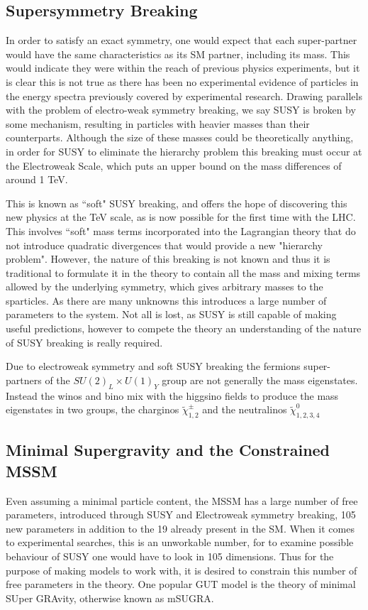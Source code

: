 \subsection{Supersymmetry Breaking}

In order to satisfy an exact symmetry, one would expect that each super-partner would have the same characteristics as its SM partner, including its mass. This would indicate they were within the reach of previous physics experiments, but it is clear this is not true as there has been no experimental evidence of particles in the energy spectra previously covered by experimental research. Drawing parallels with the problem of electro-weak symmetry breaking, we say SUSY is broken by some mechanism, resulting in particles with heavier masses than their counterparts. Although the size of these masses could be theoretically anything, in order for SUSY to eliminate the hierarchy problem this breaking must occur at the Electroweak Scale, which puts an upper bound on the mass differences of around 1 TeV.  

This is known as ``soft" SUSY breaking, and offers the hope of discovering this new physics at the TeV scale, as is now possible for the first time with the LHC. This involves ``soft" mass terms incorporated into the Lagrangian theory that do not introduce quadratic divergences that would provide a new "hierarchy problem". However, the nature of this breaking is not known and thus it is traditional to formulate it in the theory to contain all the mass and mixing terms allowed by the underlying symmetry, which gives arbitrary masses to the sparticles. As there are many unknowns this introduces a large number of parameters to the system. Not all is lost, as SUSY is still capable of making useful predictions, however to compete the theory an understanding of the nature of SUSY breaking is really required. 

Due to electroweak symmetry and soft SUSY breaking the fermions super-partners of the $SU(2)_{L} \times U(1)_{Y}$ group are not generally the mass eigenstates. Instead the winos and bino mix with the higgsino fields to produce the mass eigenstates in two groups, the charginos $\tilde{\chi}^{\pm}_{1,2}$ and the neutralinos $\tilde{\chi}^{0}_{1,2,3,4}$


\subsection{Minimal Supergravity and the Constrained MSSM}

Even assuming a minimal particle content, the MSSM has a large number of free parameters, introduced through SUSY and Electroweak symmetry breaking, 105 new parameters in addition to the 19 already present in the SM. When it comes to experimental searches, this is an unworkable number, for to examine possible behaviour of SUSY one would have to look in 105 dimensions. Thus for the purpose of making models to work with, it is desired to constrain this number of free parameters in the theory. One popular GUT model is the theory of minimal SUper GRAvity, otherwise known as mSUGRA. 

